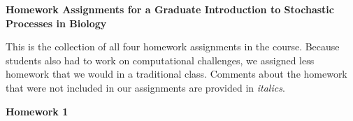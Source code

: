 \documentclass[12pt]{article}
\begin{document}
\begin{center}
{\Large  \bf Homework Assignments for a Graduate Introduction to Stochastic Processes in Biology
\\ \vskip5mm }
\end{center}


This is the collection of all four homework assignments in the course.  Because students
also had to work on computational challenges, we assigned less homework that we would
in a traditional class. Comments about the homework that were not included in our assignments
are provided in \emph{italics}.

\begin{center}
{\Large \bf Homework 1
\\ \vskip5mm }
\end{center}

\vskip5mm 
\end{document}
